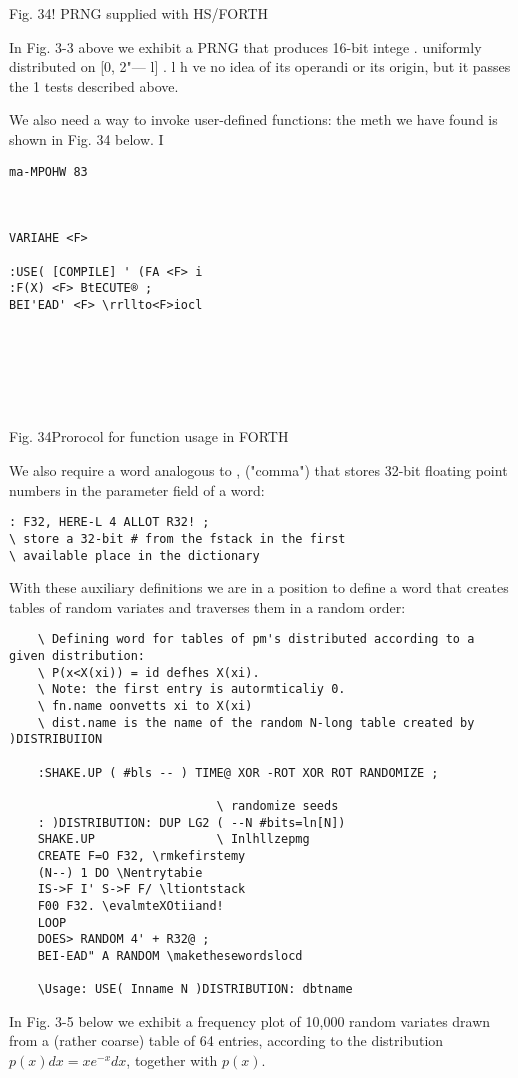 Fig. 34! PRNG supplied with HS/FORTH

In Fig. 3-3 above we exhibit a PRNG that produces 16-bit intege .
uniformly distributed on [0, 2"— l] . l h ve no idea of its
operandi or its origin, but it passes the 1 tests described above.

We also need a way to invoke user-defined functions: the meth
we have found is shown in Fig. 34 below. I

\begin{verbatim}
ma-MPOHW 83

 

VARIAHE <F>

:USE( [COMPILE] ' (FA <F> i
:F(X) <F> BtECUTE® ;
BEI'EAD' <F> \rrllto<F>iocl

 

 

 
\end{verbatim}

Fig. 34Prorocol for function usage in FORTH

We also require a word analogous to , ("comma") that stores
32-bit floating point numbers in the parameter field of a word:

\begin{verbatim}
: F32, HERE-L 4 ALLOT R32! ;
\ store a 32-bit # from the fstack in the first
\ available place in the dictionary
\end{verbatim}

With these auxiliary definitions we are in a position to define a
word that creates tables of random variates and traverses them in a random order:

\begin{verbatim}
    \ Defining word for tables of pm's distributed according to a given distribution:
    \ P(x<X(xi)) = id defhes X(xi).
    \ Note: the first entry is autormticaliy 0.  
    \ fn.name oonvetts xi to X(xi) 
    \ dist.name is the name of the random N-long table created by )DISTRIBUIION

    :SHAKE.UP ( #bls -- ) TIME@ XOR -ROT XOR ROT RANDOMIZE ;

                             \ randomize seeds
    : )DISTRIBUTION: DUP LG2 ( --N #bits=ln[N])
    SHAKE.UP                 \ Inlhllzepmg
    CREATE F=O F32, \rmkefirstemy
    (N--) 1 DO \Nentrytabie
    IS->F I' S->F F/ \ltiontstack
    F00 F32. \evalmteXOtiiand!
    LOOP
    DOES> RANDOM 4' + R32@ ;
    BEI-EAD" A RANDOM \makethesewordslocd

    \Usage: USE( Inname N )DISTRIBUTION: dbtname
\end{verbatim}
In Fig. 3-5 below we exhibit a frequency plot of 10,000 random
variates drawn from a (rather coarse) table of 64 entries, according to the
distribution $p(x)dx=xe^{-x}dx$, together with $p(x)$.

